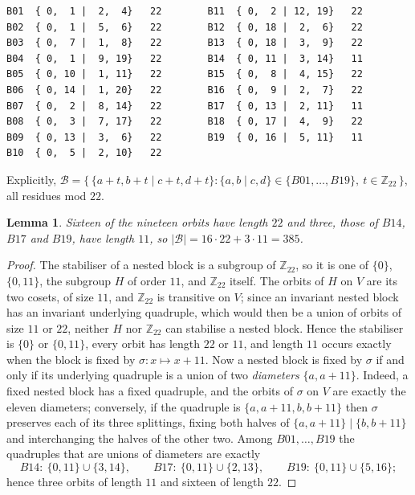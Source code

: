\documentclass[11pt]{amsart}
\newtheorem{lemma}[theorem]{Lemma}
\theoremstyle{remark}
\newcommand{\Zn}[1]{\mathbb{Z}_{#1}}
\newcommand{\nb}[4]{\{#1,#2\mid #3,#4\}}
\begin{document}
\begin{center}
\begin{verbatim}
B01  { 0,  1 |  2,  4}   22        B11  { 0,  2 | 12, 19}   22
B02  { 0,  1 |  5,  6}   22        B12  { 0, 18 |  2,  6}   22
B03  { 0,  7 |  1,  8}   22        B13  { 0, 18 |  3,  9}   22
B04  { 0,  1 |  9, 19}   22        B14  { 0, 11 |  3, 14}   11
B05  { 0, 10 |  1, 11}   22        B15  { 0,  8 |  4, 15}   22
B06  { 0, 14 |  1, 20}   22        B16  { 0,  9 |  2,  7}   22
B07  { 0,  2 |  8, 14}   22        B17  { 0, 13 |  2, 11}   11
B08  { 0,  3 |  7, 17}   22        B18  { 0, 17 |  4,  9}   22
B09  { 0, 13 |  3,  6}   22        B19  { 0, 16 |  5, 11}   11
B10  { 0,  5 |  2, 10}   22
\end{verbatim}
\end{center}

Explicitly, $\mathcal B=\bigl\{\,\nb{a+t}{b+t}{c+t}{d+t}: \nb abcd \in
\{B01,\dots,B19\},\ t\in\Zn{22}\,\bigr\}$, all residues mod $22$.

\begin{lemma}\label{lem:orbits}
Sixteen of the nineteen orbits have length $22$ and three, those of $B14$,
$B17$ and $B19$, have length $11$, so $|\mathcal B|=16\cdot22+3\cdot11=385$.
\end{lemma}

\begin{proof}
The stabiliser of a nested block is a subgroup of $\Zn{22}$, so it is one of
$\{0\}$, $\{0,11\}$, the subgroup $H$ of order $11$, and $\Zn{22}$ itself. The
orbits of $H$ on $V$ are its two cosets, of size $11$, and $\Zn{22}$ is
transitive on $V$; since an invariant nested block has an invariant underlying
quadruple, which would then be a union of orbits of size $11$ or $22$, neither
$H$ nor $\Zn{22}$ can stabilise a nested block. Hence the stabiliser is $\{0\}$
or $\{0,11\}$, every orbit has length $22$ or $11$, and length $11$
occurs exactly when the block is fixed by $\sigma:x\mapsto x+11$. Now a nested
block is fixed by $\sigma$ if and only if its underlying quadruple is a union of
two \emph{diameters} $\{a,a+11\}$. Indeed, a fixed nested block has a fixed
quadruple, and the orbits of $\sigma$ on $V$ are exactly the eleven diameters;
conversely, if the quadruple is $\{a,a+11,b,b+11\}$ then $\sigma$ preserves each
of its three splittings, fixing both halves of
$\{a,a+11\}\mid\{b,b+11\}$ and interchanging the halves of the other two.
Among $B01,\dots,B19$ the quadruples that are unions of diameters are exactly
\[
 B14:\ \{0,11\}\cup\{3,14\},\qquad
 B17:\ \{0,11\}\cup\{2,13\},\qquad
 B19:\ \{0,11\}\cup\{5,16\};
\]
hence three orbits of length $11$ and sixteen of length $22$.
\end{proof}
\end{document}

